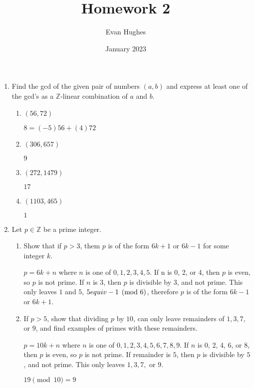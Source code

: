 \documentclass{article}
\title{Homework 2}
\author{Evan Hughes}
\date{January 2023}
\begin{document}
\maketitle
\begin{enumerate}

    \item Find the gcd of the given pair of numbers $(a, b)$ and express at least one of the gcd's as a $\mathbb{Z}$-linear combination of $a$ and $b$.
    
    \begin{enumerate}
        \item $(56,72)$
        
        $8 = (-5)56+(4)72$
        \item $(306,657)$
        
        $9$
        \item $(272,1479)$
        
        $17$
        \item $(1103,465)$

        $1$
    \end{enumerate}
    
    \item Let $p \in \mathbb{Z}$ be a prime integer.
    \begin{enumerate}
        \item Show that if $p > 3$, them $p$ is of the form $6k+1$ or $6k-1$ for some integer $k$.
        
        $p = 6k + n$ where $n$ is one of $0,1,2,3,4,5$. If n is 0, 2, or 4, then $p$ is even, so $p$ is not prime.
        If $n$ is 3, then $p$ is divisible by $3$, and not prime. This only leaves $1$ and $5$, $5 \\equiv -1 \pmod 6$, 
        therefore $p$ is of the form $6k-1$ or $6k+1$.
        
        \item If $p > 5$, show that dividing $p$ by $10$, can only leave remainders of $1, 3, 7,$ or $9$, and find examples of primes with these remainders.
        
        $p = 10k + n$ where $n$ is one of $0,1,2,3,4,5,6,7,8,9$. If $n$ is 0, 2, 4, 6, or 8, then $p$ is even, so $p$ is not prime.
        If remainder is $5$, then $p$ is divisible by $5$, and not prime. This only leaves $1, 3, 7,$ or $9$.

        $19 \pmod 10 = 9$


\end{enumerate}
\end{enumerate}
\end{document}
